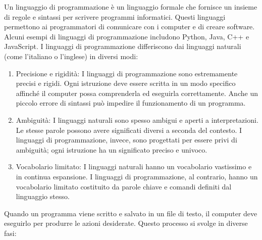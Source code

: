 \documentclass[
  letterpaper,
]{scrbook}
\providecommand{\tightlist}{%
  \setlength{\itemsep}{0pt}\setlength{\parskip}{0pt}}\usepackage{longtable,booktabs,array}
\begin{document}
Un linguaggio di programmazione è un linguaggio formale che fornisce un
insieme di regole e sintassi per scrivere programmi informatici. Questi
linguaggi permettono ai programmatori di comunicare con i computer e di
creare software. Alcuni esempi di linguaggi di programmazione includono
Python, Java, C++ e JavaScript. I linguaggi di programmazione
differiscono dai linguaggi naturali (come l'italiano o l'inglese) in
diversi modi:

\begin{enumerate}
\def\labelenumi{\arabic{enumi}.}
\tightlist
\item
  Precisione e rigidità: I linguaggi di programmazione sono estremamente
  precisi e rigidi. Ogni istruzione deve essere scritta in un modo
  specifico affinché il computer possa comprenderla ed eseguirla
  correttamente. Anche un piccolo errore di sintassi può impedire il
  funzionamento di un programma.
\item
  Ambiguità: I linguaggi naturali sono spesso ambigui e aperti a
  interpretazioni. Le stesse parole possono avere significati diversi a
  seconda del contesto. I linguaggi di programmazione, invece, sono
  progettati per essere privi di ambiguità; ogni istruzione ha un
  significato preciso e univoco.
\item
  Vocabolario limitato: I linguaggi naturali hanno un vocabolario
  vastissimo e in continua espansione. I linguaggi di programmazione, al
  contrario, hanno un vocabolario limitato costituito da parole chiave e
  comandi definiti dal linguaggio stesso.
\end{enumerate}

Quando un programma viene scritto e salvato in un file di testo, il
computer deve eseguirlo per produrre le azioni desiderate. Questo
processo si svolge in diverse fasi:
\end{document}
